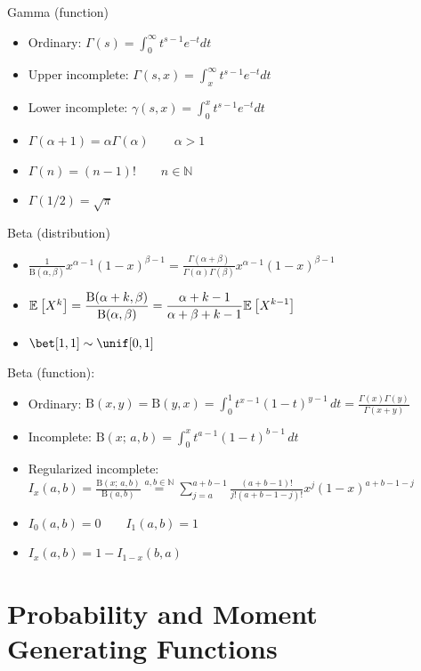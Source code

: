 \documentclass[landscape]{article}
\begin{document}
\begin{multicols*}{2}
Gamma (function)
\begin{itemize}
  \item Ordinary: $\Gamma(s) = \int_0^\infty t^{s-1} e^{-t}dt$
  \item Upper incomplete: $\Gamma(s,x) = \int_x^\infty t^{s-1} e^{-t}dt$
  \item Lower incomplete: $\gamma(s,x) = \int_0^x t^{s-1} e^{-t}dt$
  \item $\Gamma(\alpha + 1) = \alpha \Gamma(\alpha) \qquad \alpha>1$
  \item $\Gamma(n) = (n-1)! \qquad n \in \mathbb N$
  \item $\Gamma(1/2) = \sqrt{\pi}$
\end{itemize}

Beta (distribution)
\begin{itemize}
  \item $\displaystyle
    \frac{1}{\text{B}(\alpha,\beta)}x^{\alpha-1}(1-x)^{\beta-1} 
    = \frac{\Gamma(\alpha+\beta)}{\Gamma(\alpha)\Gamma(\beta)}
    x^{\alpha-1}(1-x)^{\beta-1} $
  \item $\mathbb{E}_{}\left[X^k\right] 
    = \displaystyle\frac{\text{B}(\alpha+k,\beta)}{\text{B}(\alpha,\beta)}
    = \displaystyle\frac{\alpha+k-1}{\alpha+\beta+k-1}\mathbb{E}_{}\left[X^{k-1}\right]$
  \item $\bet[1,1] \dist \unif[0,1]$
\end{itemize}

Beta (function):
\begin{itemize}
  \item Ordinary: $\text{B}(x,y) = \text{B}(y,x) 
    = \displaystyle\int_0^1 t^{x-1}(1-t)^{y-1} \,dt
    = \displaystyle\frac{\Gamma(x)\Gamma(y)}{\Gamma(x+y)}$
  \item Incomplete: $\text{B}(x;\,a,b) 
    = \displaystyle\int_0^x t^{a-1}(1-t)^{b-1} \,dt$
  \item Regularized incomplete: \\
    $I_x(a,b) = \displaystyle\frac{\text{B}(x;\,a,b)}{\text{B}(a,b)}
      \stackrel{a,b\in\mathbb N}{=} 
      \sum_{j=a}^{a+b-1} \frac{(a+b-1)!}{j!(a+b-1-j)!}x^j(1-x)^{a+b-1-j}$
  \item $I_0(a,b) = 0 \qquad I_1(a,b) = 1$
  \item $I_x(a,b) = 1 - I_{1-x}(b,a)$
\end{itemize}

\section{Probability and Moment Generating Functions}


\end{multicols*}
\end{document}
